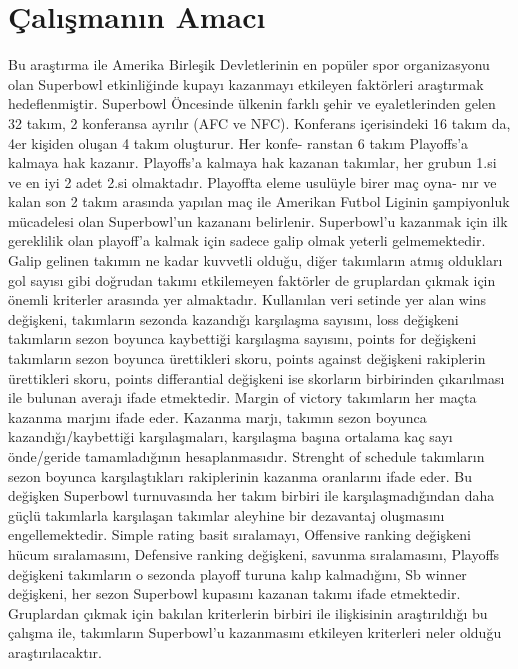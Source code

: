 \documentclass[
  12pt,
]{article}
\begin{document}
\hypertarget{uxe7alux131ux15fmanux131n-amacux131}{%
\section{Çalışmanın Amacı}\label{uxe7alux131ux15fmanux131n-amacux131}}

Bu araştırma ile Amerika Birleşik Devletlerinin en popüler spor organizasyonu olan Superbowl etkinliğinde kupayı kazanmayı etkileyen faktörleri araştırmak hedeflenmiştir. Superbowl Öncesinde ülkenin farklı şehir ve eyaletlerinden gelen 32 takım, 2 konferansa ayrılır (AFC ve NFC). Konferans içerisindeki 16 takım da, 4er kişiden oluşan 4 takım oluşturur. Her konfe- ranstan 6 takım Playoffs'a kalmaya hak kazanır. Playoffs'a kalmaya hak kazanan takımlar, her grubun 1.si ve en iyi 2 adet 2.si olmaktadır. Playoffta eleme usulüyle birer maç oyna- nır ve kalan son 2 takım arasında yapılan maç ile Amerikan Futbol Liginin şampiyonluk mücadelesi olan Superbowl'un kazananı belirlenir. Superbowl'u kazanmak için ilk gereklilik olan playoff'a kalmak için sadece galip olmak yeterli gelmemektedir. Galip gelinen takımın ne kadar kuvvetli olduğu, diğer takımların atmış oldukları gol sayısı gibi doğrudan takımı etkilemeyen faktörler de gruplardan çıkmak için önemli kriterler arasında yer almaktadır.
Kullanılan veri setinde yer alan wins değişkeni, takımların sezonda kazandığı karşılaşma sayısını, loss değişkeni takımların sezon boyunca kaybettiği karşılaşma sayısını, points for değişkeni takımların sezon boyunca ürettikleri skoru, points against değişkeni rakiplerin ürettikleri skoru, points differantial değişkeni ise skorların birbirinden çıkarılması ile bulunan averajı ifade etmektedir.
Margin of victory takımların her maçta kazanma marjını ifade eder. Kazanma marjı, takımın sezon boyunca kazandığı/kaybettiği karşılaşmaları, karşılaşma başına ortalama kaç sayı önde/geride tamamladığının hesaplanmasıdır.
Strenght of schedule takımların sezon boyunca karşılaştıkları rakiplerinin kazanma oranlarını ifade eder. Bu değişken Superbowl turnuvasında her takım birbiri ile karşılaşmadığından daha güçlü takımlarla karşılaşan takımlar aleyhine bir dezavantaj oluşmasını engellemektedir.
Simple rating basit sıralamayı, Offensive ranking değişkeni hücum sıralamasını, Defensive ranking değişkeni, savunma sıralamasını, Playoffs değişkeni takımların o sezonda playoff turuna kalıp kalmadığını, Sb winner değişkeni, her sezon Superbowl kupasını kazanan takımı ifade etmektedir.
Gruplardan çıkmak için bakılan kriterlerin birbiri ile ilişkisinin araştırıldığı bu çalışma ile, takımların Superbowl'u kazanmasını etkileyen kriterleri neler olduğu araştırılacaktır.
\end{document}
